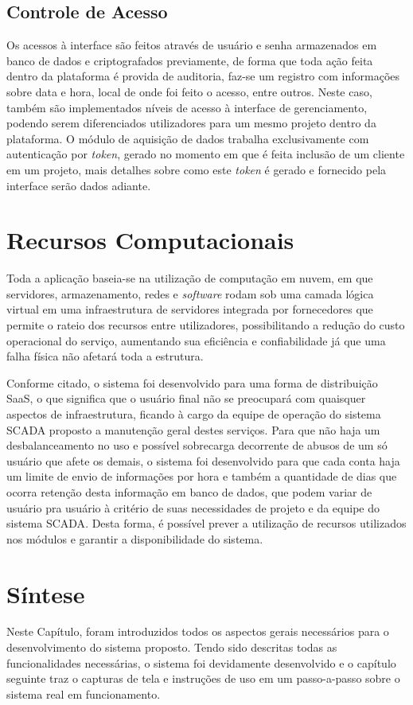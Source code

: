         \subsection{Controle de Acesso}
        \label{sec:controle-acesso}
        Os acessos à interface são feitos através de usuário e senha armazenados em banco de dados e criptografados previamente, de forma que toda ação feita dentro da plataforma é provida de auditoria, faz-se um registro com informações sobre data e hora, local de onde foi feito o acesso, entre outros. Neste caso, também são implementados níveis de acesso à interface de gerenciamento, podendo serem diferenciados utilizadores para um mesmo projeto dentro da plataforma. O módulo de aquisição de dados trabalha exclusivamente com autenticação por \textit{token}, gerado no momento em que é feita inclusão de um cliente em um projeto, mais detalhes sobre como este \textit{token} é gerado e fornecido pela interface serão dados adiante.
        
\section{Recursos Computacionais}
\label{sec:recursos-computacionais }
    Toda a aplicação baseia-se na utilização de computação em nuvem, em que servidores, armazenamento, redes e \textit{software} rodam sob uma camada lógica virtual em uma infraestrutura de servidores integrada por fornecedores que permite o rateio dos recursos entre utilizadores, possibilitando a redução do custo operacional do serviço, aumentando sua eficiência e confiabilidade já que uma falha física não afetará toda a estrutura.
    
    Conforme citado, o sistema foi desenvolvido para uma forma de distribuição \gls{SaaS}, o que significa que o usuário final não se preocupará com quaisquer aspectos de infraestrutura, ficando à cargo da equipe de operação do sistema \gls{SCADA} proposto a manutenção geral destes serviços. Para que não haja um desbalanceamento no uso e possível sobrecarga decorrente de abusos de um só usuário que afete os demais, o sistema foi desenvolvido para que cada conta haja um limite de envio de informações por hora e também a quantidade de dias que ocorra retenção desta informação em banco de dados, que podem variar de usuário pra usuário à critério de suas necessidades de projeto e da equipe do sistema \gls{SCADA}. Desta forma, é possível prever a utilização de recursos utilizados nos módulos e garantir a disponibilidade do sistema.
    
\section{Síntese}
\label{sec:sintese-sistema}

Neste Capítulo, foram introduzidos todos os aspectos gerais necessários para o desenvolvimento do sistema proposto. Tendo sido descritas todas as funcionalidades necessárias, o sistema foi devidamente desenvolvido e o capítulo seguinte traz o capturas de tela e instruções de uso em um passo-a-passo sobre o sistema real em funcionamento.